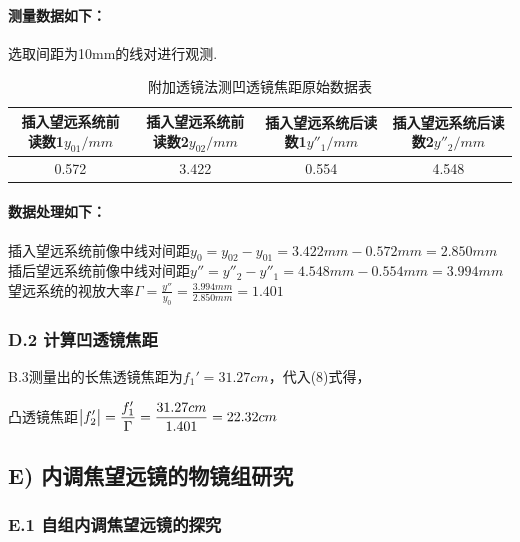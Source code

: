\documentclass[UTF8]{ctexart}
\begin{document}
\paragraph{测量数据如下：}\quad\par
选取间距为10mm的线对进行观测.
\begin{table}[H]\begin{center}
    \caption{附加透镜法测凹透镜焦距原始数据表}
\resizebox{\textwidth}{!}
{
    \begin{tabular}{|c|c|c|c|}
        \hline
        插入望远系统前读数1\quad$y_{01}/mm$&插入望远系统前读数2\quad$y_{02}/mm$&插入望远系统后读数1\quad$y''_{1}/mm$&插入望远系统后读数2\quad$y''_{2}/mm$\\
        \hline
        0.572&3.422&0.554&4.548\\
        \hline
    \end{tabular}
}
\end{center}\end{table}

\paragraph{数据处理如下：}\quad\par
\begin{center}
    插入望远系统前像中线对间距\quad$y_0=y_{02}-y_{01}=3.422mm-0.572mm=2.850mm$\\
    插后望远系统前像中线对间距\quad$y''=y''_{2}-y''_{1}=4.548mm-0.554mm=3.994mm$\\
    望远系统的视放大率\quad$\displaystyle{\Gamma=\frac{y''}{y_0}=\frac{3.994mm}{2.850mm}=1.401}$
\end{center}
\subsubsection*{D.2 计算凹透镜焦距}
B.3测量出的长焦透镜焦距为$f_1'=31.27cm$，代入(8)式得，
\begin{center}凸透镜焦距\quad$\displaystyle{\big{|}f_2'\big{|}=\frac{f_1'}{\Gamma}=\frac{31.27cm}{1.401}=22.32cm}$\end{center}


\subsection*{ E) 内调焦望远镜的物镜组研究}
\subsubsection*{E.1 自组内调焦望远镜的探究}
\end{document}
